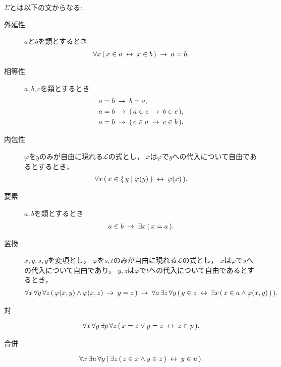 	$\Sigma$とは以下の文からなる:
	\begin{description}
		\item[外延性] $a$と$b$を類とするとき
			\begin{align}
				\forall x\, (\, x \in a \hspace{0.25em}\leftrightarrow\hspace{0.25em} x \in b\, ) \hspace{0.25em}\rightarrow\hspace{0.25em} a = b.
			\end{align}
			
		\item[相等性] $a,b,c$を類とするとき
			\begin{align}
				a = b &\hspace{0.25em}\rightarrow\hspace{0.25em} b = a, \\
				a = b &\hspace{0.25em}\rightarrow\hspace{0.25em} (\, a \in c \hspace{0.25em}\rightarrow\hspace{0.25em} b \in c\, ), \\
				a = b &\hspace{0.25em}\rightarrow\hspace{0.25em} (\, c \in a \hspace{0.25em}\rightarrow\hspace{0.25em} c \in b\, ).
			\end{align}
		
		\item[内包性] $\varphi$を$y$のみが自由に現れる$\mathcal{L}$の式とし，
			$x$は$\varphi$で$y$への代入について自由であるとするとき，
			\begin{align}
				\forall x\, (\, x \in \{\, y \mid \varphi(y)\, \} \hspace{0.25em}\leftrightarrow\hspace{0.25em} \varphi(x)\, ).
			\end{align}
		
		\item[要素] $a,b$を類とするとき
			\begin{align}
				a \in b \hspace{0.25em}\rightarrow\hspace{0.25em} \exists x\, (\, x = a\, ).
			\end{align}
		
		\item[置換] $x,y,s,y$を変項とし，
			$\varphi$を$s,t$のみが自由に現れる$\mathcal{L}$の式とし，
			$x$は$\varphi$で$s$への代入について自由であり，
			$y,z$は$\varphi$で$t$への代入について自由であるとするとき，
			\begin{align}
				\forall x\, \forall y\, \forall z\, 
				(\, \varphi(x,y) \wedge \varphi(x,z)
				\hspace{0.25em}\rightarrow\hspace{0.25em} y = z\, )
				\hspace{0.25em}\rightarrow\hspace{0.25em} \forall a\, \exists z\, \forall y\,
				(\, y \in z \hspace{0.25em}\leftrightarrow\hspace{0.25em} \exists x\, (\, x \in a \wedge 
				\varphi(x,y)\, )\, ).
			\end{align}
			
		\item[対] 
			\begin{align}
				\forall x\, \forall y\, \exists p\, \forall z\, 
				(\, x = z \vee y = z \hspace{0.25em}\leftrightarrow\hspace{0.25em} z \in p\, ).
			\end{align}
			
		\item[合併] 
			\begin{align}
				\forall x\, \exists u\, \forall y\, (\, \exists z\, (\, z \in x \wedge y \in z\, ) \hspace{0.25em}\leftrightarrow\hspace{0.25em} y \in u\, ).
			\end{align}
			

\end{description}
